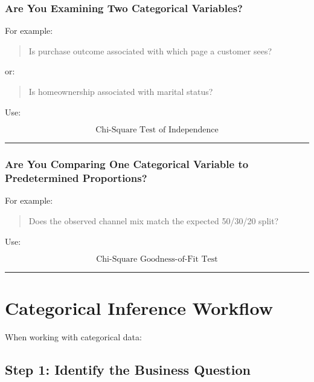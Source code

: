 \documentclass[
  letterpaper,
  DIV=11,
  numbers=noendperiod]{scrreprt}
\begin{document}
\subsection{Are You Examining Two Categorical
Variables?}\label{are-you-examining-two-categorical-variables}

For example:

\begin{quote}
Is purchase outcome associated with which page a customer sees?
\end{quote}

or:

\begin{quote}
Is homeownership associated with marital status?
\end{quote}

Use:

\[
\boxed{\text{Chi-Square Test of Independence}}
\]

\begin{center}\rule{0.5\linewidth}{0.5pt}\end{center}

\subsection{Are You Comparing One Categorical Variable to Predetermined
Proportions?}\label{are-you-comparing-one-categorical-variable-to-predetermined-proportions}

For example:

\begin{quote}
Does the observed channel mix match the expected 50/30/20 split?
\end{quote}

Use:

\[
\boxed{\text{Chi-Square Goodness-of-Fit Test}}
\]

\begin{center}\rule{0.5\linewidth}{0.5pt}\end{center}


\chapter{Categorical Inference
Workflow}\label{categorical-inference-workflow}

When working with categorical data:

\section{Step 1: Identify the Business
Question}\label{step-1-identify-the-business-question}
\end{document}
